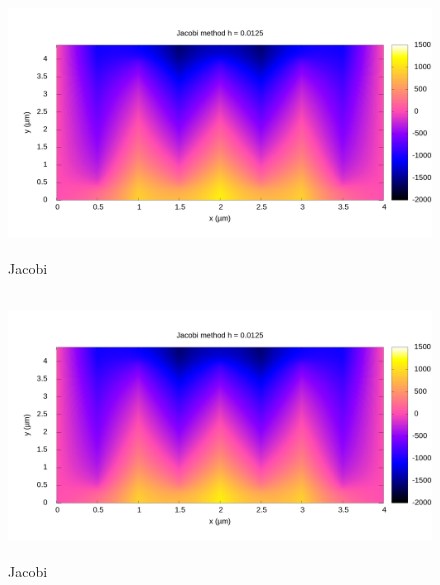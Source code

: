 \begin{figure}[ht]
    \centering
    \includegraphics[height= 70mm]{content/graphs/Jacobi_0125_map.png}
    \caption{Jacobi}
    \label{fig2:}
\end{figure}%
\begin{figure}[h]
    \centering
    \includegraphics[height= 70mm]{content/graphs/Jacobi_0125_map.png}
    \caption{Jacobi}
    \label{fig3:}
\end{figure}%



